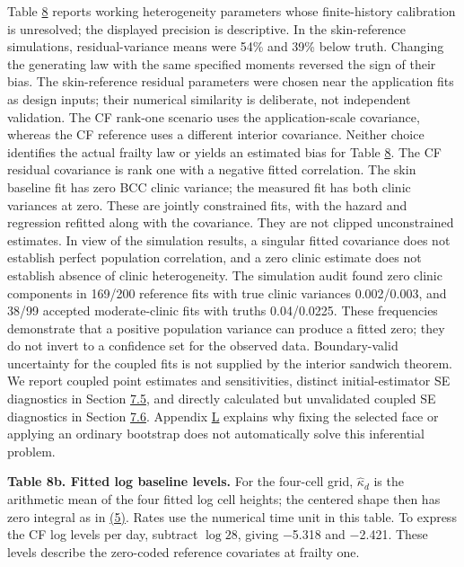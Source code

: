 \documentclass[11pt]{article}
\begin{document}
Table \hyperref[tab:8]{8} reports working heterogeneity parameters whose finite-history calibration is unresolved; the displayed precision is descriptive. In the skin-reference simulations, residual-variance means were 54\% and 39\% below truth. Changing the generating law with the same specified moments reversed the sign of their bias. The skin-reference residual parameters were chosen near the application fits as design inputs; their numerical similarity is deliberate, not independent validation. The CF rank-one scenario uses the application-scale covariance, whereas the CF reference uses a different interior covariance. Neither choice identifies the actual frailty law or yields an estimated bias for Table \hyperref[tab:8]{8}. The CF residual covariance is rank one with a negative fitted correlation. The skin baseline fit has zero BCC clinic variance; the measured fit has both clinic variances at zero. These are jointly constrained fits, with the hazard and regression refitted along with the covariance. They are not clipped unconstrained estimates. In view of the simulation results, a singular fitted covariance does not establish perfect population correlation, and a zero clinic estimate does not establish absence of clinic heterogeneity. The simulation audit found zero clinic components in 169/200 reference fits with true clinic variances 0.002/0.003, and 38/99 accepted moderate-clinic fits with truths 0.04/0.0225. These frequencies demonstrate that a positive population variance can produce a fitted zero; they do not invert to a confidence set for the observed data. Boundary-valid uncertainty for the coupled fits is not supplied by the interior sandwich theorem. We report coupled point estimates and sensitivities, distinct initial-estimator SE diagnostics in Section \hyperref[sec:7.5]{7.5}, and directly calculated but unvalidated coupled SE diagnostics in Section \hyperref[sec:7.6]{7.6}. Appendix \hyperref[sec:L]{L} explains why fixing the selected face or applying an ordinary bootstrap does not automatically solve this inferential problem.

\label{tab:8b}
\textbf{Table 8b. Fitted log baseline levels.} For the four-cell grid, \(\widehat\kappa_d\) is the arithmetic mean of the four fitted log cell heights; the centered shape then has zero integral as in \hyperref[eq:5]{(5)}. Rates use the numerical time unit in this table. To express the CF log levels per day, subtract \(\log 28\), giving $-$5.318 and $-$2.421. These levels describe the zero-coded reference covariates at frailty one.
\end{document}
